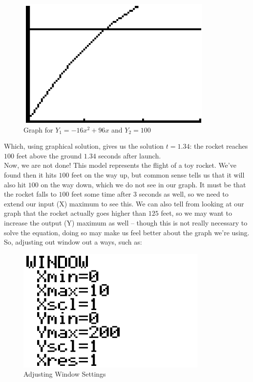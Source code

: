 {	\begin{figure}[H]
		\centering
		\includegraphics[scale=0.8]{Sections/FunctionsasModelsImages/Figure02.png}
		\caption{Graph for $Y_1=-16x^2+96x$ and $Y_2=100$}
	\end{figure}
	Which, using graphical solution, gives us the solution $t=1.34$: the rocket reaches $100$ feet above the ground $1.34$ seconds after launch.\\
	
	Now, we are not done! This model represents the flight of a toy rocket. We’ve found then it hits $100$ feet on the way up, but common sense tells us that it will also hit $100$ on the way down, which we do not see in our graph. It must be that the rocket falls to $100$ feet some time after $3$ seconds as well, so we need to extend our input (X) maximum to see this. We can also tell from looking at our graph that the rocket actually goes higher than $125$ feet, so we may want to increase the output (Y) maximum as well – though this is not really necessary to solve the equation, doing so may make us feel better about the graph we’re using.\\
	
	So, adjusting out window out a ways, such as:
	
	\begin{figure}[H]
		\centering
		\includegraphics[scale=1.0]{Sections/FunctionsasModelsImages/Figure03.png}
		\caption{Adjusting Window Settings}
	\end{figure}
	
}
